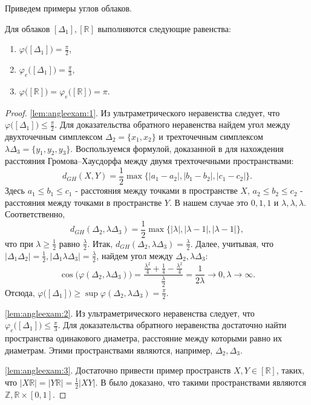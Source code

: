Приведем примеры углов облаков.
\begin{lemma}
  Для облаков \( [\Delta _{1}], [\mathbb{R}] \) выполняются следующие
  равенства: \label{lem:angleexam}
  \begin{enumerate}
    \item \( \varphi \big([\Delta _{1}]\big) = \frac{\pi }{2}
      \),\label{lem:angleexam:1}
    \item \( \varphi_e \big([\Delta _{1}]\big) = \frac{\pi }{3}
      \),\label{lem:angleexam:2}
    \item \( \varphi \big([\mathbb{R}]\big) = \varphi_e
      \big([\mathbb{R}]\big) = \pi  \).\label{lem:angleexam:3}
  \end{enumerate}
\end{lemma}
\begin{proof}
  \ref{lem:angleexam:1}. Из ультраметрического неравенства следует, что \(
  \varphi \big([\Delta _1]\big)\le \frac{\pi }{2} \). Для доказательства
  обратного неравенства найдем угол между двухточечным симплексом \( \Delta
  _{2} = \{x_1, x_2\} \) и трехточечным симплексом \(
  \lambda \Delta _3  = \{y_1,y_2, y_3\}\). Воспользуемся формулой, доказанной в
  \cite{ivanov2016} для нахождения расстояния Громова--Хаусдорфа
  между двумя трехточечными пространствами:
  \[
    d_{GH}(X,Y) = \frac{1}{2} \max\big\{ |a_1 - a_2|,|b_1 - b_2|,|c_1
    - c_2|\big\}.
  \]
  Здесь \( a_1 \le b_1 \le c_1 \) - расстояния между точками в
  пространстве \( X \), \( a_2 \le b_2 \le c_2 \) - расстояния между
  точками в пространстве \( Y \). В нашем случае это \( 0,1,1 \) и \(
  \lambda , \lambda , \lambda . \) Соответственно,
  \[
    d_{GH}(\Delta_2, \lambda \Delta _{3}) =\frac{1}{2}
    \max\big\{|\lambda |, | \lambda  -1|, |\lambda -1|\big\},
  \]
  что
  при \( \lambda \ge \frac 1 2 \) равно \(\frac \lambda 2 \). Итак, \(d
    _{GH}(\Delta _2, \lambda \Delta _3) =
  \frac{\lambda }{2} \). Далее, учитывая, что \( |\Delta _1
    \Delta _2|=\frac{1}{2}, |\Delta _1 \lambda \Delta
  _3|=\frac{\lambda }{2} \), найдем угол между \( \Delta _2,
  \lambda \Delta _3 \):
  \[ \cos \big(\varphi (\Delta _2 , \lambda \Delta _3)\big)
    =\frac{\frac{\lambda ^2}{4} + \frac{1}{4} - \frac{\lambda
    ^2}{4}}{\frac{\lambda }{2}} = \frac{1}{2 \lambda }
    \rightarrow 0, \lambda \rightarrow \infty.
  \]
  Отсюда, \( \varphi \big([\Delta _1]\big) \ge \sup \varphi (\Delta _2,
  \lambda \Delta _3) = \frac \pi 2. \)

  \ref{lem:angleexam:2}. Из ультраметрического неравенства следует, что \(
  \varphi_e \big([\Delta _1]\big)\le \frac{\pi }{3} \). Для доказательства
  обратного неравенства достаточно найти пространства одинакового диаметра,
  расстояние между которыми равно их диаметрам. Этими пространствами
  являются, например, \( \Delta _2, \Delta _3 \).

  \ref{lem:angleexam:3}. Достаточно привести пример пространств \( X,Y\in
  [\mathbb{R}] \), таких, что \( |X \mathbb{R}| = |Y \mathbb{R}| = \frac 1 2
  |XY|. \) В \cite{mikhailovUnreleased} было доказано, что такими
  пространствами являются \( \mathbb{Z}, \mathbb{R}\times
  [0,1] \).

\end{proof}
